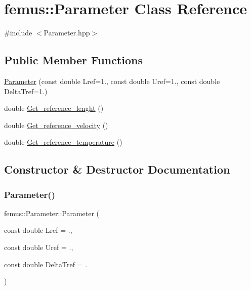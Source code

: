 \hypertarget{classfemus_1_1_parameter}{}\section{femus\+:\+:Parameter Class Reference}
\label{classfemus_1_1_parameter}


{\ttfamily \#include $<$Parameter.\+hpp$>$}

\subsection*{Public Member Functions}
\begin{DoxyCompactItemize}
\item 
\mbox{\hyperlink{classfemus_1_1_parameter_a109db2c750194a852d2c9533249cc2f9}{Parameter}} (const double Lref=1., const double Uref=1., const double Delta\+Tref=1.)
\item 
double \mbox{\hyperlink{classfemus_1_1_parameter_a1d27ac6c41d5037a5cebb5f5a9e1b203}{Get\+\_\+reference\+\_\+lenght}} ()
\item 
double \mbox{\hyperlink{classfemus_1_1_parameter_aaad3fbaf22261a9b29e00ff2c06c2d0d}{Get\+\_\+reference\+\_\+velocity}} ()
\item 
double \mbox{\hyperlink{classfemus_1_1_parameter_a39561836eaa009fdce3ff8c4b27b8a8b}{Get\+\_\+reference\+\_\+temperature}} ()
\end{DoxyCompactItemize}


\subsection{Constructor \& Destructor Documentation}
\mbox{\label{classfemus_1_1_parameter_a109db2c750194a852d2c9533249cc2f9}} 
\subsubsection{\texorpdfstring{Parameter()}{Parameter()}}
{\footnotesize\ttfamily femus\+::\+Parameter\+::\+Parameter (\begin{DoxyParamCaption}\item[{const double}]{Lref = {.},  }\item[{const double}]{Uref = {.},  }\item[{const double}]{Delta\+Tref = {.} }\end{DoxyParamCaption})}

